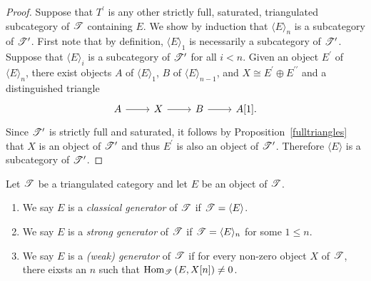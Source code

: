 \documentclass[dissertation.tex]{subfiles}
\begin{document}
\begin{prop}
\begin{proof}
    Suppose that $T^\prime$ is any other strictly full, saturated, triangulated subcategory of $\mathscr{T}$ containing $E$.
    We show by induction that $\langle E \rangle_n$ is a subcategory of $\mathscr{T}^\prime$.
    First note that by definition, $\langle E \rangle_1$ is necessarily a subcategory of $\mathscr{T}^\prime$.
    Suppose that $\langle E \rangle_i$ is a subcategory of $\mathscr{T}^\prime$ for all $i < n$.
    Given an object $E^\prime$ of $\langle E \rangle_n$, there exist objects $A$ of $\langle E \rangle_1$, $B$ of $\langle E \rangle_{n-1}$, and $X \cong E^\prime \oplus E^{\prime\prime}$ and a distinguished triangle
    $$\begin{tikzcd}
      A \arrow{r} & X \arrow{r} & B \arrow{r} & A[1].
    \end{tikzcd}$$
    Since $\mathscr{T}^\prime$ is strictly full and saturated, it follows by Proposition~\ref{fulltriangles} that $X$ is an object of $\mathscr{T}^\prime$ and thus $E^\prime$ is also an object of $\mathscr{T}^\prime$.
    Therefore $\langle E \rangle$ is a subcategory of $\mathscr{T}^\prime$.
  \end{proof}
\end{prop}

\begin{defn}
  Let $\mathscr{T}$ be a triangulated category and let $E$ be an object of $\mathscr{T}$.
  \begin{enumerate}
  \item
    We say $E$ is a {\it classical generator} of $\mathscr{T}$ if $\mathscr{T} = \langle E \rangle$.
  \item
    We say $E$ is a {\it strong generator} of $\mathscr{T}$ if $\mathscr{T} = \langle E \rangle_n$ for some $1 \leq n$.
  \item
    We say $E$ is a {\it (weak) generator} of $\mathscr{T}$ if for every non-zero object $X$ of $\mathscr{T}$, there eixsts an $n$ such that $\operatorname{Hom}_{\mathscr{T}}\left(E,X[n]\right) \neq 0$.
  \end{enumerate}
\end{defn}
\end{document}
